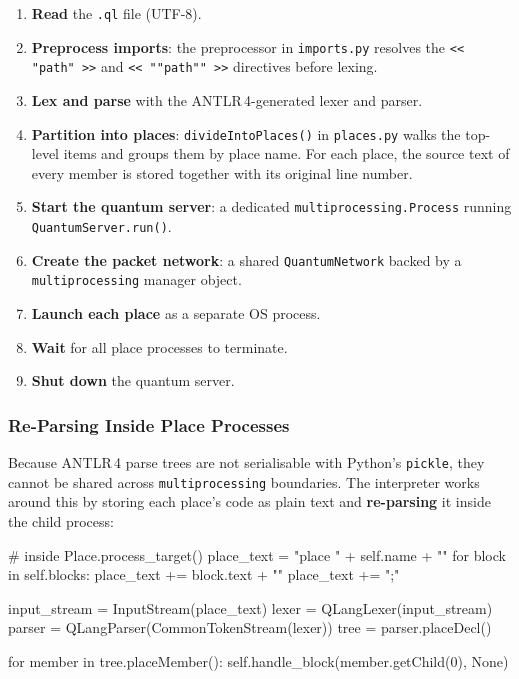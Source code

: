 \begin{enumerate}
    \item \textbf{Read} the \texttt{.ql} file (UTF-8).
    \item \textbf{Preprocess imports}: the preprocessor in \texttt{imports.py}
          resolves the \texttt{<< "path" >>} and \texttt{<< ""path"" >>}
          directives before lexing.
    \item \textbf{Lex and parse} with the ANTLR\,4-generated lexer and parser.
    \item \textbf{Partition into places}: \texttt{divideIntoPlaces()} in
          \texttt{places.py} walks the top-level items and groups them by
          place name. For each place, the source text of every member is
          stored together with its original line number.
    \item \textbf{Start the quantum server}: a dedicated
          \texttt{multiprocessing.Process} running
          \texttt{QuantumServer.run()}.
    \item \textbf{Create the packet network}: a shared
          \texttt{QuantumNetwork} backed by a
          \texttt{multiprocessing} manager object.
    \item \textbf{Launch each place} as a separate OS process.
    \item \textbf{Wait} for all place processes to terminate.
    \item \textbf{Shut down} the quantum server.
\end{enumerate}

\subsubsection{Re-Parsing Inside Place Processes}

Because ANTLR\,4 parse trees are not serialisable with Python's
\texttt{pickle}, they cannot be shared across \texttt{multiprocessing}
boundaries.  The interpreter works around this by storing each place's code
as plain text and \textbf{re-parsing} it inside the child process:

\begin{codebox}
# inside Place.process_target()
place_text = "place " + self.name + "{\n"
for block in self.blocks:
    place_text += block.text + "\n"
place_text += "};"

input_stream = InputStream(place_text)
lexer  = QLangLexer(input_stream)
parser = QLangParser(CommonTokenStream(lexer))
tree   = parser.placeDecl()

for member in tree.placeMember():
    self.handle_block(member.getChild(0), None)
\end{codebox}


